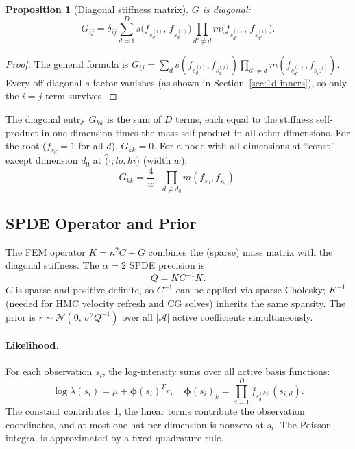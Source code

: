 \documentclass[11pt]{article}
\newtheorem{proposition}{Proposition}
\newcommand{\bphi}{\boldsymbol{\phi}}
\begin{document}
\begin{proposition}[Diagonal stiffness matrix]
\label{prop:stiffness-new}
$G$ is diagonal:
\begin{equation}
  G_{ij} = \delta_{ij}
    \sum_{d=1}^D s\!\bigl(f_{s_d^{(i)}},\, f_{s_d^{(i)}}\bigr)
    \prod_{d' \neq d} m\!\bigl(f_{s_{d'}^{(i)}},\, f_{s_{d'}^{(i)}}\bigr).
  \label{eq:hat-stiffness-new}
\end{equation}
\end{proposition}
\begin{proof}
The general formula is $G_{ij} = \sum_d s(f_{s_d^{(i)}},f_{s_d^{(j)}})
\prod_{d'\neq d}m(f_{s_{d'}^{(i)}},f_{s_{d'}^{(j)}})$.  Every off-diagonal
$s$-factor vanishes (as shown in Section~\ref{sec:1d-inners}), so only the
$i=j$ term survives.
\end{proof}

\noindent
The diagonal entry $G_{kk}$ is the sum of $D$ terms, each equal to the
stiffness self-product in one dimension times the mass self-product in
all other dimensions.  For the root ($f_{s_d} = 1$ for all $d$), $G_{kk}=0$.
For a node with all dimensions at ``const'' except dimension $d_0$ at
$\hat(\cdot;lo,hi)$ (width $w$):
\begin{equation}
  G_{kk} = \frac{4}{w} \cdot \prod_{d \neq d_0} m(f_{s_d},f_{s_d}).
  \label{eq:Gkk-example}
\end{equation}

\subsection{SPDE Operator and Prior}
\label{sec:hat-spde}

The FEM operator $K = \kappa^2 C + G$ combines the (sparse) mass matrix with
the diagonal stiffness.  The $\alpha=2$ SPDE precision is
\begin{equation}
  Q = K C^{-1} K.
  \label{eq:hat-Q-new}
\end{equation}
$C$ is sparse and positive definite, so $C^{-1}$ can be applied via sparse
Cholesky; $K^{-1}$ (needed for HMC velocity refresh and CG solves) inherits
the same sparsity.  The prior is $r \sim \mathcal{N}(0,\,\sigma^2 Q^{-1})$
over all $|\mathcal{A}|$ active coefficients simultaneously.

\paragraph{Likelihood.}
For each observation $s_i$, the log-intensity sums over all active basis
functions:
\begin{equation}
  \log\lambda(s_i) = \mu + \bphi(s_i)^T r,
  \quad
  \bphi(s_i)_k = \prod_{d=1}^D f_{s_d^{(k)}}(s_{i,d}).
  \label{eq:hat-loglik-new}
\end{equation}
The constant contributes 1, the linear terms contribute the observation
coordinates, and at most one hat per dimension is nonzero at $s_i$.
The Poisson integral is approximated by a fixed quadrature rule.
\end{document}
